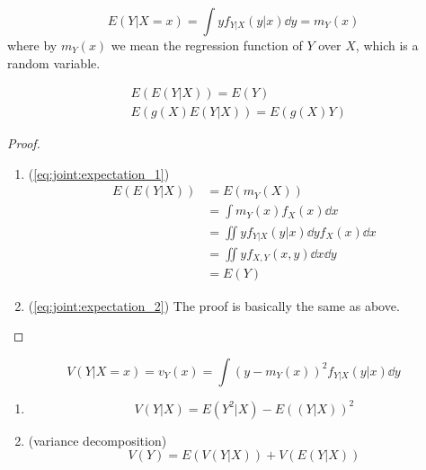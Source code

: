 \documentclass[12pt]{extarticle}
\begin{document}
\begin{definition}
    \begin{equation}
        E(Y|X = x) = \int y f_{Y | X}(y | x) \dd{y} = m_Y(x)
    \end{equation}
    where by $m_Y(x)$ we mean the regression function of $Y$ over $X$, which is a random variable.
\end{definition}

\begin{theorem}
    \begin{align}
         & E(E(Y|X)) = E(Y) \label{eq:joint:expectation_1}         \\
         & E(g(X)E(Y|X)) = E(g(X)Y) \label{eq:joint:expectation_2}
    \end{align}
\end{theorem}

\begin{proof}
    \skiplineafterproof
    \begin{enumerate}[label=\roman*.]
        \item (\autoref{eq:joint:expectation_1})
              \begin{align}
                  E(E(Y|X)) & = E(m_Y(X))                                 \\
                            & = \int m_Y(x) f_X(x) \dd{x}                 \\
                            & = \iint y f_{Y|X}(y|x) \dd{y} f_X(x) \dd{x} \\
                            & = \iint y f_{X, Y}(x, y) \dd{x} \dd{y}      \\
                            & = E(Y)
              \end{align}
        \item (\autoref{eq:joint:expectation_2}) The proof is basically the same as above.
    \end{enumerate}
\end{proof}

\begin{definition}
    \begin{equation}
        V(Y | X = x) = v_Y(x) = \int \left(y - m_Y(x) \right)^2 f_{Y|X}(y|x) \dd{y}
    \end{equation}
\end{definition}

\begin{theorem}
    \skiplineafterproof
    \begin{enumerate}[label=\roman*.]
        \item \begin{equation}
                  V(Y|X) = E(Y^2 | X) - E\left((Y|X)\right)^2
              \end{equation}

        \item (variance decomposition)
              \begin{equation}
                  V(Y) = E(V(Y|X)) + V(E(Y|X))
              \end{equation}
    \end{enumerate}
\end{theorem}
\end{document}
